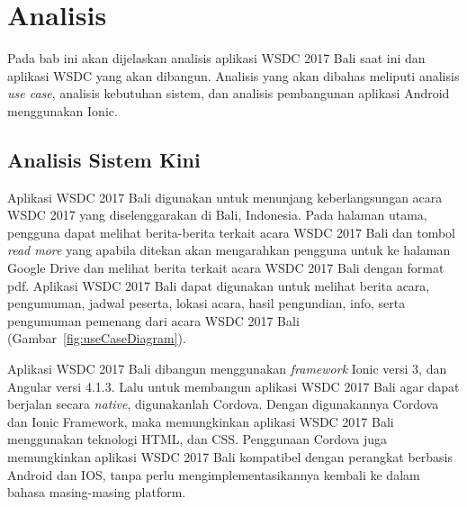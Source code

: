 \chapter{Analisis}
\label{chap:analisis}

Pada bab ini akan dijelaskan analisis aplikasi WSDC 2017 Bali saat ini dan aplikasi WSDC yang akan dibangun. Analisis yang akan dibahas meliputi analisis {\it use case}, analisis kebutuhan sistem, dan analisis pembangunan aplikasi Android menggunakan Ionic.

\section{Analisis Sistem Kini}
\label{sec:analisisSistemKini}
Aplikasi WSDC 2017 Bali digunakan untuk menunjang keberlangsungan acara WSDC 2017 yang diselenggarakan di Bali, Indonesia. Pada halaman utama, pengguna dapat melihat berita-berita terkait acara WSDC 2017 Bali dan tombol {\it read more} yang apabila ditekan akan mengarahkan pengguna untuk ke halaman Google Drive dan melihat berita terkait acara WSDC 2017 Bali dengan format pdf. Aplikasi WSDC 2017 Bali dapat digunakan untuk melihat berita acara, pengumuman, jadwal peserta, lokasi acara, hasil pengundian, info, serta pengumuman pemenang dari acara WSDC 2017 Bali (Gambar~\ref{fig:useCaseDiagram}). 

Aplikasi WSDC 2017 Bali dibangun menggunakan {\it framework} Ionic versi 3, dan Angular versi 4.1.3. Lalu untuk membangun aplikasi WSDC 2017 Bali agar dapat berjalan secara {\it native}, digunakanlah Cordova. Dengan digunakannya Cordova dan Ionic Framework, maka memungkinkan aplikasi WSDC 2017 Bali menggunakan teknologi HTML, dan CSS. Penggunaan Cordova juga memungkinkan aplikasi WSDC 2017 Bali kompatibel dengan perangkat berbasis Android dan IOS, tanpa perlu mengimplementasikannya kembali ke dalam bahasa masing-masing platform.

